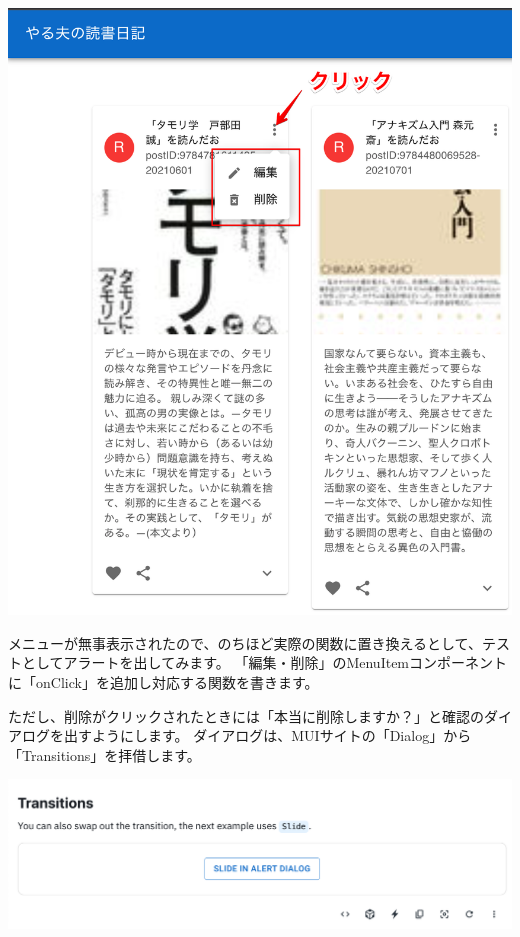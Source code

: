 \clearpage

\begin{reviewimage}%
\includegraphics[width=0.7\maxwidth]{./images/03-todo-with-react/mui012-card-MenuStep1.png}%
\label{image:03-todo-with-react:mui012-card-MenuStep1}
\end{reviewimage}

メニューが無事表示されたので、のちほど実際の関数に置き換えるとして、テストとしてアラートを出してみます。
「編集・削除」のMenuItemコンポーネントに「onClick」を追加し対応する関数を書きます。

\vspace*{\baselineskip}

ただし、削除がクリックされたときには「本当に削除しますか？」と確認のダイアログを出すようにします。
ダイアログは、MUIサイトの「Dialog」から「Transitions」を拝借します。

\begin{reviewimage}%
\includegraphics[width=0.6\maxwidth]{./images/03-todo-with-react/mui013-card-deleteDialog.png}%
\label{image:03-todo-with-react:mui013-card-deleteDialog}
\end{reviewimage}
\vspace*{\baselineskip}

